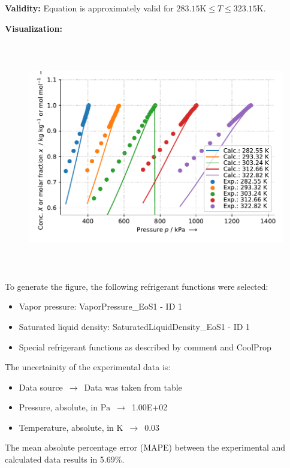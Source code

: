 \textbf{Validity:}
\newline
Equation is approximately valid for $283.15 \si{\kelvin} \leq T \leq 323.15 \si{\kelvin}$.
\newline

\textbf{Visualization:}
%
\begin{figure}[!htp]
{\noindent\includegraphics[height=10cm, keepaspectratio]{figs/abs/abs_R-134a_TriEGDME__WilsonTemperatureDl_1.pdf}}
\end{figure}
%

To generate the figure, the following refrigerant functions were selected:
\begin{itemize}
\item Vapor pressure: VaporPressure\_EoS1 - ID 1
\item Saturated liquid density: SaturatedLiquidDensity\_EoS1 - ID 1
\item Special refrigerant functions as described by comment and CoolProp
\end{itemize}

The uncertainity of the experimental data is:
\begin{itemize}
\item Data source $\,\to\,$ Data was taken from table
\item Pressure, absolute, in $\si{\pascal}$ $\,\to\,$ 1.00E+02
\item Temperature, absolute, in $\si{\kelvin}$ $\,\to\,$ 0.03
\end{itemize}

The mean absolute percentage error (MAPE) between the experimental and calculated data results in 5.69\%.
\FloatBarrier
\newpage
